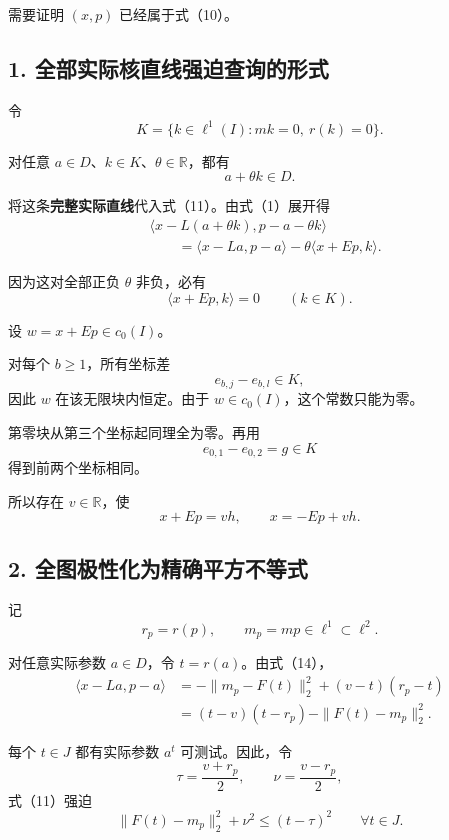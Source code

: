 \documentclass[UTF8,fontset=fandol,11pt,a4paper]{ctexart}
\begin{document}
需要证明 $(x,p)$ 已经属于式（10）。

\subsection{1. 全部实际核直线强迫查询的形式}\label{ux5168ux90e8ux5b9eux9645ux6838ux76f4ux7ebfux5f3aux8febux67e5ux8be2ux7684ux5f62ux5f0f}

令 \[
K=\{k\in\ell^1(I):mk=0,\ r(k)=0\}.
\]

对任意 $a\in D$、$k\in K$、$\theta\in\mathbb R$，都有 \[
a+\theta k\in D.
\]

将这条\textbf{完整实际直线}代入式（11）。由式（1）展开得 \[
\begin{aligned}
&\langle x-L(a+\theta k),p-a-\theta k\rangle\\
&\qquad=
\langle x-La,p-a\rangle
-\theta\langle x+Ep,k\rangle.
\end{aligned}
\tag{12}
\]

因为这对全部正负 $\theta$ 非负，必有 \[
\langle x+Ep,k\rangle=0
\qquad(k\in K).
\tag{13}
\]

设 $w=x+Ep\in c_0(I)$。

对每个 $b\ge1$，所有坐标差 \[
e_{b,j}-e_{b,l}\in K,
\] 因此 $w$ 在该无限块内恒定。由于 $w\in c_0(I)$，这个常数只能为零。

第零块从第三个坐标起同理全为零。再用 \[
e_{0,1}-e_{0,2}=g\in K
\] 得到前两个坐标相同。

所以存在 $v\in\mathbb R$，使 \[
\boxed{x+Ep=vh,\qquad x=-Ep+vh.}
\tag{14}
\]

\subsection{2. 全图极性化为精确平方不等式}\label{ux5168ux56feux6781ux6027ux5316ux4e3aux7cbeux786eux5e73ux65b9ux4e0dux7b49ux5f0f}

记 \[
r_p=r(p),\qquad m_p=mp\in\ell^1\subset\ell^2.
\]

对任意实际参数 $a\in D$，令 $t=r(a)$。由式（14）， \[
\begin{aligned}
\langle x-La,p-a\rangle
&=-\|m_p-F(t)\|_2^2+(v-t)(r_p-t)\\
&=(t-v)(t-r_p)-\|F(t)-m_p\|_2^2.
\end{aligned}
\tag{15}
\]

每个 $t\in J$ 都有实际参数 $a^t$ 可测试。因此，令 \[
\tau=\frac{v+r_p}{2},
\qquad
\nu=\frac{v-r_p}{2},
\] 式（11）强迫 \[
\boxed{
\|F(t)-m_p\|_2^2+\nu^2
\le(t-\tau)^2
\qquad\forall t\in J.
}
\tag{16}
\]
\end{document}
